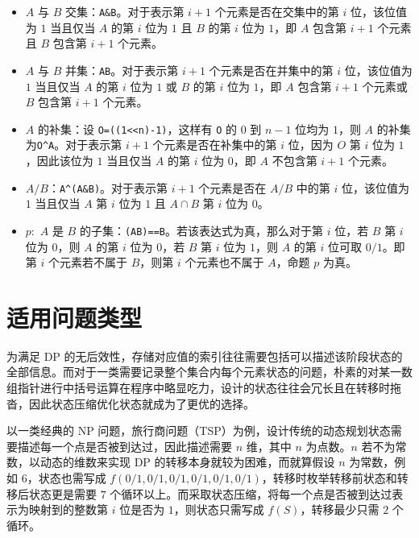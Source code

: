 \begin{itemize}

\item
  \(A\) 与 \(B\) 交集：\texttt{A\&B}。对于表示第 \(i+1\)
  个元素是否在交集中的第 \(i\) 位，该位值为 \(1\) 当且仅当 \(A\) 的第
  \(i\) 位为 \(1\) 且 \(B\) 的第 \(i\) 位为 \(1\)，即 \(A\) 包含第
  \(i+1\) 个元素且 \(B\) 包含第 \(i+1\) 个元素。
\item
  \(A\) 与 \(B\) 并集：\texttt{A\textbar{}B}。对于表示第 \(i+1\)
  个元素是否在并集中的第 \(i\) 位，该位值为 \(1\) 当且仅当 \(A\) 的第
  \(i\) 位为 \(1\) 或 \(B\) 的第 \(i\) 位为 \(1\)，即 \(A\) 包含第
  \(i+1\) 个元素或 \(B\) 包含第 \(i+1\) 个元素。
\item
  \(A\) 的补集：设 \texttt{O=((1\textless{}\textless{}n)-1)}，这样有
  \texttt{O} 的 \(0\) 到 \(n-1\) 位均为 \(1\)，则 \(A\)
  的补集为\texttt{O\^{}A}。对于表示第 \(i+1\) 个元素是否在补集中的第
  \(i\) 位，因为 \(O\) 第 \(i\) 位为 \(1\)，因此该位为 \(1\) 当且仅当
  \(A\) 的第 \(i\) 位为 \(0\)，即 \(A\) 不包含第 \(i+1\) 个元素。
\item
  \(A/B\)：\texttt{A\^{}(A\&B)}。对于表示第 \(i+1\) 个元素是否在 \(A/B\)
  中的第 \(i\) 位，该位值为 \(1\) 当且仅当 \(A\) 第 \(i\) 位为 \(1\) 且
  \(A\cap B\) 第 \(i\) 位为 \(0\)。
\item
  \(p:\) \(A\) 是 \(B\)
  的子集：\texttt{(A\textbar{}B)==B}。若该表达式为真，那么对于第 \(i\)
  位，若 \(B\) 第 \(i\) 位为 \(0\)，则 \(A\) 的第 \(i\) 位为 \(0\)，若
  \(B\) 第 \(i\) 位为 \(1\)，则 \(A\) 的第 \(i\) 位可取 \(0/1\)。即第
  \(i\) 个元素若不属于 \(B\)，则第 \(i\) 个元素也不属于 \(A\)，命题
  \(p\) 为真。
\end{itemize}

\section{适用问题类型}

为满足 DP
的无后效性，存储对应值的索引往往需要包括可以描述该阶段状态的全部信息。而对于一类需要记录整个集合内每个元素状态的问题，朴素的对某一数组指针进行中括号运算在程序中略显吃力，设计的状态往往会冗长且在转移时拖沓，因此状态压缩优化状态就成为了更优的选择。

以一类经典的 NP
问题，旅行商问题（TSP）为例，设计传统的动态规划状态需要描述每一个点是否被到达过，因此描述需要
\(n\) 维，其中 \(n\) 为点数。\(n\) 若不为常数，以动态的维数来实现 DP
的转移本身就较为困难，而就算假设 \(n\) 为常数，例如 \(6\)，状态也需写成
\(f(0/1,0/1,0/1,0/1,0/1,0/1)\)，转移时枚举转移前状态和转移后状态更是需要
\(7\)
个循环以上。而采取状态压缩，将每一个点是否被到达过表示为映射到的整数第
\(i\) 位是否为 \(1\)，则状态只需写成 \(f(S)\)，转移最少只需 \(2\)
个循环。

